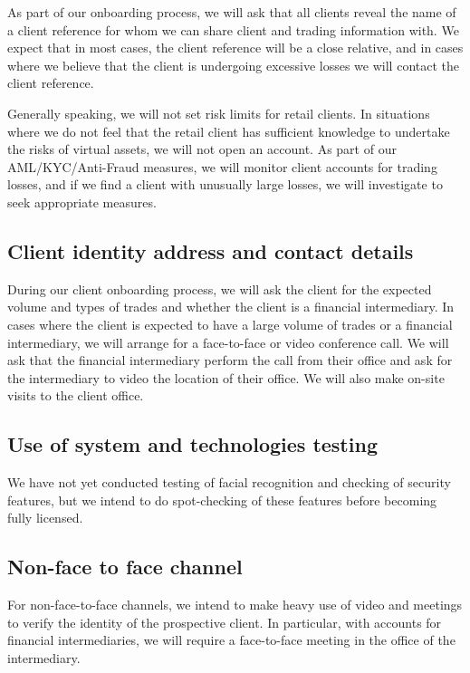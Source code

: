 As part of our onboarding process, we will ask that all clients reveal
the name of a client reference for whom we can share client and
trading information with.  We expect that in most cases, the client
reference will be a close relative, and in cases where we believe that
the client is undergoing excessive losses we will contact the client
reference.

Generally speaking, we will not set risk limits for retail clients.  In
situations where we do not feel that the retail client has sufficient
knowledge to undertake the risks of virtual assets, we will not open
an account.  As part of our AML/KYC/Anti-Fraud measures, we will
monitor client accounts for trading losses, and if we find a client
with unusually large losses, we will investigate to seek appropriate
measures.

\subsection{Client identity address and contact details}
During our client onboarding process, we will ask the client for the
expected volume and types of trades and whether the client is a
financial intermediary.  In cases where the client is expected to have
a large volume of trades or a financial intermediary, we will arrange
for a face-to-face or video conference call.  We will ask that the
financial intermediary perform the call from their office and ask for the
intermediary to video the location of their office.  We will also make
on-site visits to the client office.

\subsection{Use of system and technologies testing}
We have not yet conducted testing of facial recognition and checking
of security features, but we intend to do spot-checking of these
features before becoming fully licensed.

\subsection{Non-face to face channel}
For non-face-to-face channels, we intend to make heavy use of video and
meetings to verify the identity of the
prospective client.  In particular, with accounts for financial
intermediaries, we will require a face-to-face meeting in the office of
the intermediary.

